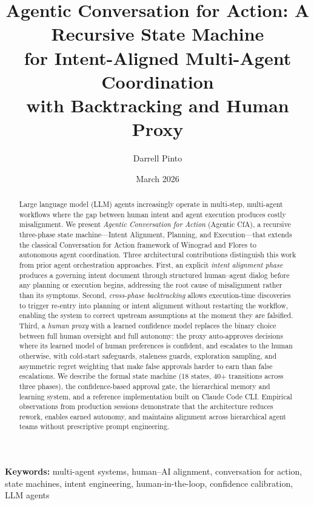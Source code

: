 \documentclass[11pt,a4paper]{article}
\title{Agentic Conversation for Action: A Recursive State Machine\\for Intent-Aligned Multi-Agent Coordination\\with Backtracking and Human Proxy}
\author{Darrell Pinto}
\date{March 2026}
\begin{document}
\maketitle

\begin{abstract}
Large language model (LLM) agents increasingly operate in multi-step,
multi-agent workflows where the gap between human intent and agent execution
produces costly misalignment. We present \emph{Agentic Conversation for Action}
(Agentic CfA), a recursive three-phase state machine---Intent Alignment,
Planning, and Execution---that extends the classical Conversation for Action
framework of Winograd and Flores to autonomous agent coordination. Three
architectural contributions distinguish this work from prior agent
orchestration approaches. First, an explicit \emph{intent alignment phase}
produces a governing intent document through structured human--agent dialog
before any planning or execution begins, addressing the root cause of
misalignment rather than its symptoms. Second, \emph{cross-phase backtracking}
allows execution-time discoveries to trigger re-entry into planning or intent
alignment without restarting the workflow, enabling the system to correct
upstream assumptions at the moment they are falsified. Third, a \emph{human
proxy} with a learned confidence model replaces the binary choice between full
human oversight and full autonomy: the proxy auto-approves decisions where its
learned model of human preferences is confident, and escalates to the human
otherwise, with cold-start safeguards, staleness guards, exploration sampling,
and asymmetric regret weighting that make false approvals harder to earn than
false escalations. We describe the formal state machine (18 states, 40+
transitions across three phases), the confidence-based approval gate, the
hierarchical memory and learning system, and a reference implementation built
on Claude Code CLI. Empirical observations from production sessions
demonstrate that the architecture reduces rework, enables earned autonomy, and
maintains alignment across hierarchical agent teams without prescriptive prompt
engineering.
\end{abstract}

\noindent\textbf{Keywords:} multi-agent systems, human--AI alignment, conversation for action, state machines, intent engineering, human-in-the-loop, confidence calibration, LLM agents

\end{document}
